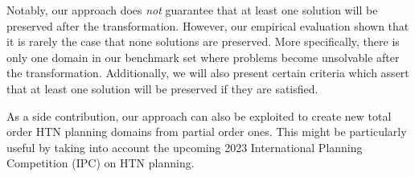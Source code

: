 Notably, our approach does \emph{not} guarantee that at least one solution will be preserved after the transformation. However, our empirical evaluation shown that it is rarely the case that none solutions are preserved. More specifically, there is only one domain in our benchmark set where problems become unsolvable after the transformation. Additionally, we will also present certain criteria which assert that at least one solution will be preserved if they are satisfied.

As a side contribution, our approach can also be exploited to create new total order HTN planning domains from partial order ones. This might be particularly useful by taking into account the upcoming 2023 International Planning Competition (IPC) on HTN planning.





